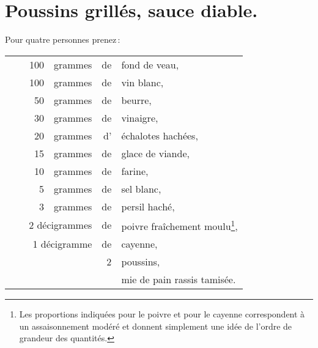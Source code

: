 \section*{\centering Poussins grillés, sauce diable.}
{}

Pour quatre personnes prenez :

\footnotesize
\begin{longtable}{rrrrrp{18em}}
  & \hspace{2em}  & 100 & grammes & de & fond de veau,                                                    \\
  & & 100 & grammes & de & vin blanc,                                                                     \\
  & &  50 & grammes & de & beurre,                                                                        \\
  & &  30 & grammes & de & vinaigre,                                                                      \\
  & &  20 & grammes & d' & échalotes hachées,                                                             \\
  & &  15 & grammes & de & glace de viande,                                                               \\
  & &  10 & grammes & de & farine,                                                                        \\
  & &   5 & grammes & de & sel blanc,                                                                     \\
  & &   3 & grammes & de & persil haché,                                                                  \\
  & \multicolumn{3}{r}{2 décigrammes} & de & poivre fraîchement moulu\footnote{Les proportions indiquées
                                             pour le poivre et pour le cayenne correspondent à un
                                             assaisonnement modéré et donnent simplement une idée
                                             de l'ordre de grandeur des quantités.},                      \\
  & \multicolumn{3}{r}{1 décigramme}  & de & cayenne,                                                     \\
  & &     &         &  2 & poussins,                                                                      \\
  & &     &         &    & mie de pain rassis tamisée.                                                    \\
\end{longtable}
\normalsize

